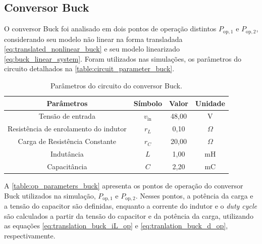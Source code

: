 \subsection{Conversor Buck}

O conversor Buck foi analisado em dois pontos de operação distintos $P_{\mathrm{op}, 1}$ e $P_{\mathrm{op}, 2}$, considerando seu modelo não linear na forma transladada \eqref{eq:translated_nonlinear_buck} e seu modelo linearizado \eqref{eq:buck_linear_system}. Foram utilizados nas simulações, os parâmetros do circuito detalhados na \autoref{table:circuit_parameter_buck}.

\vspace{8pt}
\begin{table}[H]
  \centering
  \begin{tabular}{cccc}
    \toprule
    Parâmetros & Símbolo  & Valor & Unidade \\
    \midrule
    Tensão de entrada & $v_{\mathrm{in}}$ & 48,00 & V \\
    Resistência de enrolamento do indutor & $r_L$ & 0,10 & $\Omega$ \\
    Carga de Resistência Constante & $r_{C}$ & 20,00 & $\Omega$ \\
    Indutância & $L$ & 1,00 & mH \\
    Capacitância  & $C$ & 2,20 & mC \\
    \bottomrule
  \end{tabular}
  \caption{Parâmetros do circuito do conversor Buck.}
  \label{table:circuit_parameter_buck}
\end{table}

A \autoref{table:op_parameters_buck} apresenta os pontos de operação do conversor Buck utilizados na simulação, $P_{\mathrm{op}, 1}$ e $P_{\mathrm{op}, 2}$. Nesses pontos, a potência da carga e a tensão do capacitor são definidas, enquanto a corrente do indutor e o \textit{duty cycle} são calculados a partir da tensão do capacitor e da potência da carga, utilizando as equações \eqref{eq:translation_buck_iL_op} e \eqref{eq:tranlation_buck_d_op}, respectivamente.

